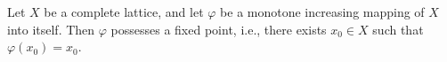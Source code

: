 Let $X$ be a complete lattice, and let $\varphi$ be a monotone increasing mapping of $X$ into itself. Then $\varphi$ possesses a fixed point, i.e., there exists $x_0 \in X$ such that $\varphi(x_0) = x_0$.

